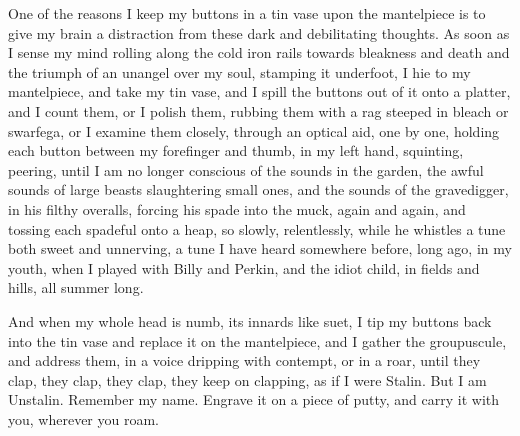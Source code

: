 One of the reasons I keep my buttons in a tin vase upon the mantelpiece is to give my brain a distraction from these dark and debilitating thoughts. As soon as I sense my mind rolling along the cold iron rails towards bleakness and death and the triumph of an unangel over my soul, stamping it underfoot, I hie to my mantelpiece, and take my tin vase, and I spill the buttons out of it onto a platter, and I count them, or I polish them, rubbing them with a rag steeped in bleach or swarfega, or I examine them closely, through an optical aid, one by one, holding each button between my forefinger and thumb, in my left hand, squinting, peering, until I am no longer conscious of the sounds in the garden, the awful sounds of large beasts slaughtering small ones, and the sounds of the gravedigger, in his filthy overalls, forcing his spade into the muck, again and again, and tossing each spadeful onto a heap, so slowly, relentlessly, while he whistles a tune both sweet and unnerving, a tune I have heard somewhere before, long ago, in my youth, when I played with Billy and Perkin, and the idiot child, in fields and hills, all summer long.

And when my whole head is numb, its innards like suet, I tip my buttons back into the tin vase and replace it on the mantelpiece, and I gather the groupuscule, and address them, in a voice dripping with contempt, or in a roar, until they clap, they clap, they clap, they keep on clapping, as if I were Stalin. But I am Unstalin. Remember my name. Engrave it on a piece of putty, and carry it with you, wherever you roam.